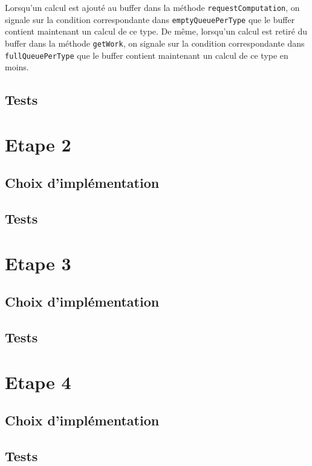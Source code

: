 \documentclass{article}
\begin{document}
Lorsqu'un calcul est ajouté au buffer dans la méthode \texttt{requestComputation}, on signale sur la condition correspondante
dans \texttt{emptyQueuePerType} que le buffer contient maintenant un calcul de ce type. De même, lorsqu'un calcul est
retiré du buffer dans la méthode \texttt{getWork}, on signale sur la condition correspondante dans \texttt{fullQueuePerType}
que le buffer contient maintenant un calcul de ce type en moins.
\subsection{Tests}

\section{Etape 2}
\subsection{Choix d'implémentation}
\subsection{Tests}

\section{Etape 3}
\subsection{Choix d'implémentation}
\subsection{Tests}

\section{Etape 4}
\subsection{Choix d'implémentation}
\subsection{Tests}
\end{document}
